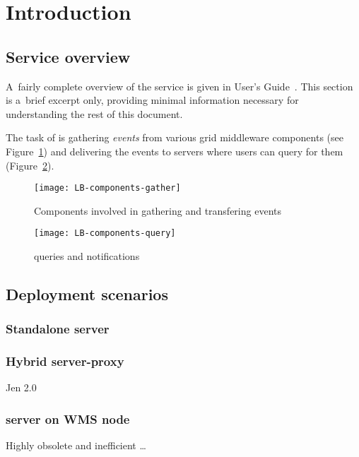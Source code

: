 \section{Introduction}


\subsection{Service overview}

A~fairly complete overview of the \LB service is given in \LB User's Guide~\cite{lbug}.
This section is a~brief excerpt only, providing minimal information necessary for
understanding the rest of this document.

The task of \LB is gathering \emph{\LB events} from various grid middleware components
(see Figure~\ref{f:comp-gather})
and delivering the events to \LB servers where users can query for them
(Figure~\ref{f:comp-query}).

\begin{figure}[ht]
\centering
\texttt{[image: LB-components-gather]}
\caption{Components involved in gathering and transfering \LB events}
\label{f:comp-gather}
\end{figure}

\begin{figure}[ht]
\centering
\texttt{[image: LB-components-query]}
\caption{\LB queries and notifications}
\label{f:comp-query}
\end{figure}




\subsection{Deployment scenarios}



\subsubsection{Standalone \LB server}

\subsubsection{Hybrid \LB server-proxy}

Jen 2.0

\subsubsection{\LB server on WMS node}
Highly obsolete and inefficient \dots
